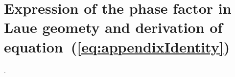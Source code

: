 \documentclass[preprint]{iucr}              %
\newcommand{\inred}[1]{{\color{red}#1}}
\begin{document}



\section{Expression of the phase factor in Laue geomety and derivation of equation~(\ref{eq:appendixIdentity})}
\label{appendix:Deformation}.
\end{document}
